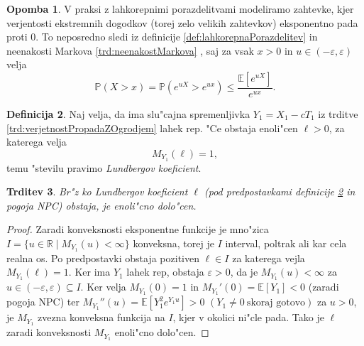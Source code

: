 \documentclass[12pt, a4paper, reqno]{amsart}
\theoremstyle{definition}
\newtheorem{definicija}{Definicija}[section]
\newtheorem{opomba}[definicija]{Opomba}
\theoremstyle{plain}
\newtheorem{trditev}[definicija]{Trditev}
\newcommand{\R}{\mathbb{R}}
\newcommand{\E}{\mathbb{E}}
\newcommand{\Prob}{\mathbb{P}}
\newcommand{\1}{\mathds{1}}
\newcommand*{\refPriloga}[1]{%
  \begingroup
    \hypersetup{
      linkcolor=properpurple,
      linkbordercolor=properpurple,
    }%
    \ref{#1}%
  \endgroup
}
\begin{document}
            \begin{opomba}
                V praksi z lahkorepnimi porazdelitvami modeliramo zahtevke, kjer verjentosti ekstremnih 
                dogodkov (torej zelo velikih zahtevkov) eksponentno pada proti $0$. To neposredno sledi iz 
                definicije \ref{def:lahkorepnaPorazdelitev} in neenakosti Markova \refPriloga{trd:neenakostMarkova}, 
                saj za vsak 
                $x>0$ in $u\in(-\varepsilon, \varepsilon)$ velja
                \begin{equation*}
                    \Prob\left(X > x\right) = \Prob\left(e^{uX} > e^{ux}\right) \leq \frac{\E\left[e^{uX}\right]}{e^{ux}}.
                \end{equation*}
                \label{op:lahkorepnaPorazdelitev}
            \end{opomba}

            \begin{definicija}
                Naj velja, da ima slu"cajna spremenljivka $Y_1 = X_1 - cT_1$ iz trditve \ref{trd:verjetnostPropadaZOgrodjem} 
                lahek rep. "Ce obstaja enoli"cen $\ell > 0$, za katerega velja
                \begin{equation*}
                    M_{Y_1}(\ell)  = 1,
                \end{equation*}
                temu "stevilu pravimo \textit{Lundbergov koeficient}.
                \label{def:LundbergovKoeficient}
            \end{definicija}

            \begin{trditev}
                Br"z ko Lundbergov koeficient $\ell$ (pod predpostavkami definicije \ref{def:LundbergovKoeficient} in 
                pogoja NPC)
                obstaja, je enoli"cno dolo"cen.
                \label{trd:enolicnostLundbergovegaKoeficienta}
            \end{trditev}

            \begin{proof}
                Zaradi konveksnosti eksponentne funkcije je mno"zica $I = \{u\in\R \mid M_{Y_1}(u) < \infty\}$ konveksna, 
                torej je $I$ interval, poltrak ali kar cela realna os. Po predpostavki obstaja pozitiven $\ell \in I$ za 
                katerega vejla $M_{Y_1}(\ell) = 1$.
                Ker ima $Y_1$ lahek rep, obstaja $\varepsilon > 0$, da je $M_{Y_1}(u) < \infty$ za $u\in(-\varepsilon, \varepsilon)\subseteq I$.
                Ker velja $M_{Y_1}(0) = 1$ in $M_{Y_1}'(0) = \E\left[Y_1\right] < 0$ (zaradi pogoja NPC) ter
                $M_{Y_1}''(u) = \E\left[Y_1^2e^{Y_1u}\right] > 0$ $(Y_1 \neq 0 \ \text{skoraj gotovo})$ za 
                $u>0$, je $M_{Y_1}$ zvezna konveksna funkcija na $I$, kjer 
                v okolici ni"cle pada. Tako je $\ell$ zaradi konveksnosti $M_{Y_1}$ enoli"cno dolo"cen.
            \end{proof}
\end{document}
